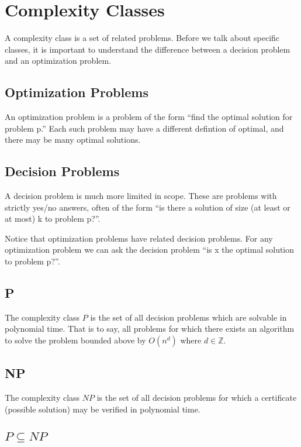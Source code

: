 \chapter{Complexity Classes}

A complexity class is a set of related problems.  Before we talk about
specific classes, it is important to understand the difference between
a decision problem and an optimization problem.

\section{Optimization Problems}

An optimization problem is a problem of the form ``find the optimal
solution for problem p.''  Each such problem may have a different
defintion of optimal, and there may be many optimal solutions.

\section{Decision Problems}

A decision problem is much more limited in scope.  These are problems
with strictly yes/no answers, often of the form ``is there a solution of
size (at least or at most) k to problem p?''.

Notice that optimization problems have related decision problems.  For
any optimization problem we can ask the decision problem ``is x the
optimal solution to problem p?''.

\section{P}

The complexity class $P$ is the set of all decision problems which are
solvable in polynomial time.  That is to say, all problems for which
there exists an algorithm to solve the problem bounded above by
$O(n^d)$ where $d \in \mathbb{Z}$.

\section{NP}

The complexity class $NP$ is the set of all decision problems for
which a certificate (possible solution) may be verified in polynomial
time.  

\section{$P \subseteq NP$}

